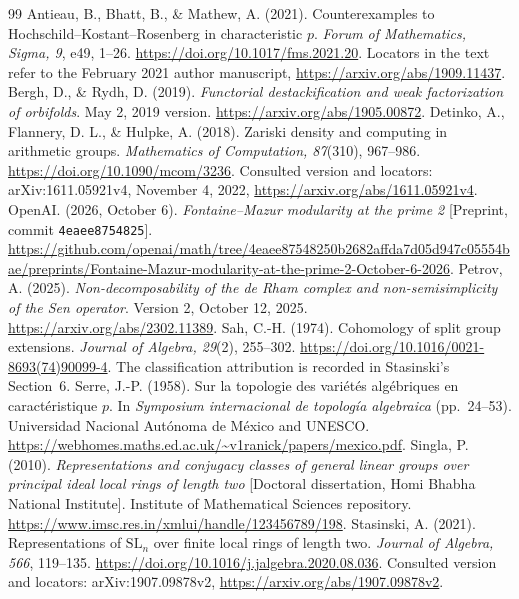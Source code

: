 \documentclass[11pt]{article}
\theoremstyle{definition}\newtheorem{definition}[theorem]{Definition}
\theoremstyle{remark}\newtheorem{remark}[theorem]{Remark}
\begin{document}
\begin{thebibliography}{99}
Antieau, B., Bhatt, B., \& Mathew, A. (2021). Counterexamples to Hochschild--Kostant--Rosenberg in characteristic $p$. \emph{Forum of Mathematics, Sigma, 9}, e49, 1--26. \url{https://doi.org/10.1017/fms.2021.20}. Locators in the text refer to the February 2021 author manuscript, \url{https://arxiv.org/abs/1909.11437}.
Bergh, D., \& Rydh, D. (2019). \emph{Functorial destackification and weak factorization of orbifolds}. May 2, 2019 version. \url{https://arxiv.org/abs/1905.00872}.
Detinko, A., Flannery, D. L., \& Hulpke, A. (2018). Zariski density and computing in arithmetic groups. \emph{Mathematics of Computation, 87}(310), 967--986. \url{https://doi.org/10.1090/mcom/3236}. Consulted version and locators: arXiv:1611.05921v4, November 4, 2022, \url{https://arxiv.org/abs/1611.05921v4}.
OpenAI. (2026, October 6). \emph{Fontaine--Mazur modularity at the prime 2} [Preprint, commit \texttt{4eaee8754825}]. \url{https://github.com/openai/math/tree/4eaee87548250b2682affda7d05d947c05554bae/preprints/Fontaine-Mazur-modularity-at-the-prime-2-October-6-2026}.
Petrov, A. (2025). \emph{Non-decomposability of the de Rham complex and non-semisimplicity of the Sen operator}. Version 2, October 12, 2025. \url{https://arxiv.org/abs/2302.11389}.
Sah, C.-H. (1974). Cohomology of split group extensions. \emph{Journal of Algebra, 29}(2), 255--302. \url{https://doi.org/10.1016/0021-8693(74)90099-4}. The classification attribution is recorded in Stasinski's Section~6.
Serre, J.-P. (1958). Sur la topologie des vari\'et\'es alg\'ebriques en caract\'eristique $p$. In \emph{Symposium internacional de topolog\'ia algebraica} (pp.~24--53). Universidad Nacional Aut\'onoma de M\'exico and UNESCO. \url{https://webhomes.maths.ed.ac.uk/~v1ranick/papers/mexico.pdf}.
Singla, P. (2010). \emph{Representations and conjugacy classes of general linear groups over principal ideal local rings of length two} [Doctoral dissertation, Homi Bhabha National Institute]. Institute of Mathematical Sciences repository. \url{https://www.imsc.res.in/xmlui/handle/123456789/198}.
Stasinski, A. (2021). Representations of $\mathrm{SL}_n$ over finite local rings of length two. \emph{Journal of Algebra, 566}, 119--135. \url{https://doi.org/10.1016/j.jalgebra.2020.08.036}. Consulted version and locators: arXiv:1907.09878v2, \url{https://arxiv.org/abs/1907.09878v2}.
\end{thebibliography}
\end{document}
